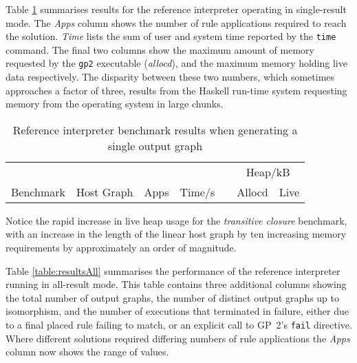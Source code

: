 Table \ref{table:resultsSingle} summarises results for the reference interpreter operating in single-result mode. The \textit{Apps} column shows the number of rule applications required to reach the solution. \textit{Time} lists the sum of user and system time reported by the \texttt{time} command. The final two columns show the maximum amount of memory requested by the \texttt{gp2} executable (\textit{allocd}), and the maximum memory holding live data respectively. The disparity between these two numbers, which sometimes approaches a factor of three, results from the Haskell run-time system requesting memory from the operating system in large chunks.

\begin{table}[h]
\begin{minipage}{\textwidth}
\centering

\begin{tabular}{llrrcrr}
\hline 
&  & & & & \multicolumn{2}{c}{Heap/kB}\\
Benchmark          & Host Graph & Apps & Time/s   & & Allocd & Live \\
\hline 

\end{tabular}

\caption[Reference interpreter benchmarks]{Reference interpreter benchmark results when generating a single output graph}

\label{table:resultsSingle}
\end{minipage}
\end{table}




Notice the rapid increase in live heap usage for the \textit{transitive closure} benchmark, with an increase in the length of the linear host graph by ten increasing memory requirements by approximately an order of magnitude. %


Table \ref{table:resultsAll} summarises the performance of the reference interpreter running in all-result mode. This table contains three additional columns showing the total number of output graphs, the number of distinct output graphs up to isomorphism, and the number of executions that terminated in failure, either due to a final placed rule failing to match, or an explicit call to GP~2's \texttt{fail} directive. Where different solutions required differing numbers of rule applications the \textit{Apps} column now shows the range of values.


